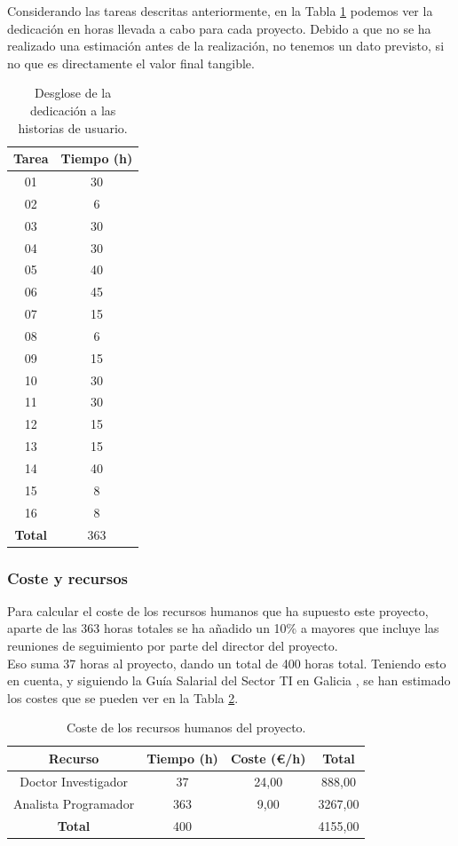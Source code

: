 Considerando las tareas descritas anteriormente, en la Tabla \ref{table:dedicacion} podemos ver la dedicación en horas llevada a cabo para cada proyecto. Debido a que no se ha realizado una estimación antes de la realización, no tenemos un dato previsto, si no que es directamente el valor final tangible.

\begin{table}[!h]
	\centering
	\begin{tabular}{ c c }
		\bfseries{Tarea} & \bfseries{Tiempo (h)} \\
		\hline
		01 & 30 \\
		02 & 6 \\
		03 & 30 \\
		04 & 30 \\
		05 & 40 \\
		06 & 45 \\
		07 & 15 \\
		08 & 6 \\
		09 & 15 \\
		10 & 30 \\
		11 & 30 \\
		12 & 15 \\
		13 & 15 \\
		14 & 40 \\
		15 & 8 \\
		16 & 8 \\
		\hline
		\bfseries{Total} & 363 \\
		\hline
	\end{tabular}
	\caption{Desglose de la dedicación a las historias de usuario.}
	\label{table:dedicacion}
\end{table}

\subsubsection{Coste y recursos}

Para calcular el coste de los recursos humanos que ha supuesto este proyecto, aparte de las 363 horas totales se ha añadido un 10\% a mayores que incluye las reuniones de seguimiento por parte del director del proyecto.\\ 

Eso suma 37 horas al proyecto, dando un total de 400 horas total. Teniendo esto en cuenta, y siguiendo la Guía Salarial del Sector TI en Galicia \cite{guia_galicia}, se han estimado los costes que se pueden ver en la Tabla \ref{table:costehumano}.

\begin{table}[!h]
	\centering
	\begin{tabular}{ c c c c }
		\bfseries{Recurso} & \bfseries{Tiempo (h)} & \bfseries{Coste (\euro/h)} & \bfseries{Total} \\
		\hline
		Doctor Investigador & 37 & 24,00 & 888,00 \\
		Analista Programador & 363 & 9,00 & 3267,00 \\
		\hline
		\bfseries{Total} & 400 & & 4155,00 \\
		\hline
	\end{tabular}
	\caption{Coste de los recursos humanos del proyecto.}\label{table:costehumano}
\end{table}

